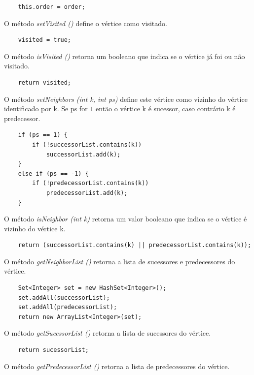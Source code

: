 \documentclass[a4paper,12pt]{report}
\begin{document}
\begin{lstlisting}
    this.order = order;
\end{lstlisting}

O método \textit{setVisited ()} define o vértice como visitado.

\begin{lstlisting}
    visited = true;
\end{lstlisting}

O método \textit{isVisited ()} retorna um booleano que indica se o vértice já foi ou não visitado.

\begin{lstlisting}
    return visited;
\end{lstlisting}

O método \textit{setNeighbors (int k, int ps)} define este vértice como vizinho do vértice identificado por k. Se ps for $1$ então o vértice k é sucessor, caso contrário k é predecessor.

\begin{lstlisting}
    if (ps == 1) {
        if (!successorList.contains(k))
            successorList.add(k);
    }
    else if (ps == -1) {
        if (!predecessorList.contains(k))
            predecessorList.add(k);
    }
\end{lstlisting}

O método \textit{isNeighbor (int k)} retorna um valor booleano que indica se o vértice é vizinho do vértice k.

\begin{lstlisting}
    return (successorList.contains(k) || predecessorList.contains(k));
\end{lstlisting}

O método \textit{getNeighborList ()} retorna a lista de sucessores e predecessores do vértice.

\begin{lstlisting}
    Set<Integer> set = new HashSet<Integer>();
    set.addAll(successorList);
    set.addAll(predecessorList);
    return new ArrayList<Integer>(set);
\end{lstlisting}

O método \textit{getSucessorList ()} retorna a lista de sucessores do vértice.

\begin{lstlisting}
    return sucessorList;
\end{lstlisting}

O método \textit{getPredecessorList ()} retorna a lista de predecessores do vértice.
\end{document}

